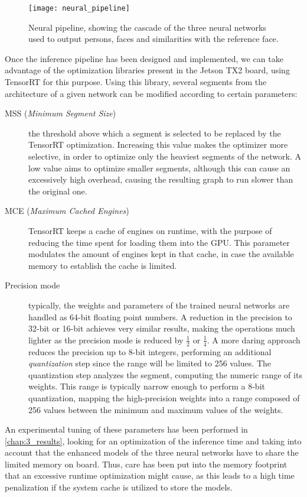 \begin{figure}[h]
	\centering
	\texttt{[image: neural\_pipeline]}
	\caption{Neural pipeline, showing the cascade of the three neural networks used to output persons, faces and similarities with the reference face.}
	\label{fig:2_neural_pipeline}
\end{figure}


Once the inference pipeline has been designed and implemented, we can take advantage of the optimization libraries present in the Jetson TX2 board, using TensorRT for this purpose. Using this library, several segments from the architecture of a given network can be modified according to certain parameters:

\begin{description}
	\item[MSS (\textit{Minimum Segment Size})] the threshold above which a segment is selected to be replaced by the TensorRT optimization. Increasing this value makes the optimizer more selective, in order to optimize only the heaviest segments of the network. A low value aims to optimize smaller segments, although this can cause an excessively high overhead, causing the resulting graph to run slower than the original one. 
	\item[MCE (\textit{Maximum Cached Engines})] TensorRT keeps a cache of engines on runtime, with the purpose of reducing the time spent for loading them into the GPU. This parameter modulates the amount of engines kept in that cache, in case the available memory to establish the cache is limited.
	\item[Precision mode] typically, the weights and parameters of the trained neural networks are handled as 64-bit floating point numbers. A reduction in the precision to 32-bit or 16-bit achieves very similar results, making the operations much lighter as the precision mode is reduced by $\frac{1}{2}$ or $\frac{1}{4}$. A more daring approach reduces the precision up to 8-bit integers, performing an additional \textit{quantization} step since the range will be limited to 256 values. The quantization step analyzes the segment, computing the numeric range of its weights. This range is typically narrow enough to perform a 8-bit quantization, mapping the high-precision weights into a range composed of 256 values between the minimum and maximum values of the weights.
\end{description}

An experimental tuning of these parameters has been performed in \autoref{chap:3_results}, looking for an optimization of the inference time and taking into account that the enhanced models of the three neural networks have to share the limited memory on board. Thus, care has been put into the memory footprint that an excessive runtime optimization might cause, as this leads to a high time penalization if the system cache is utilized to store the models.\\


